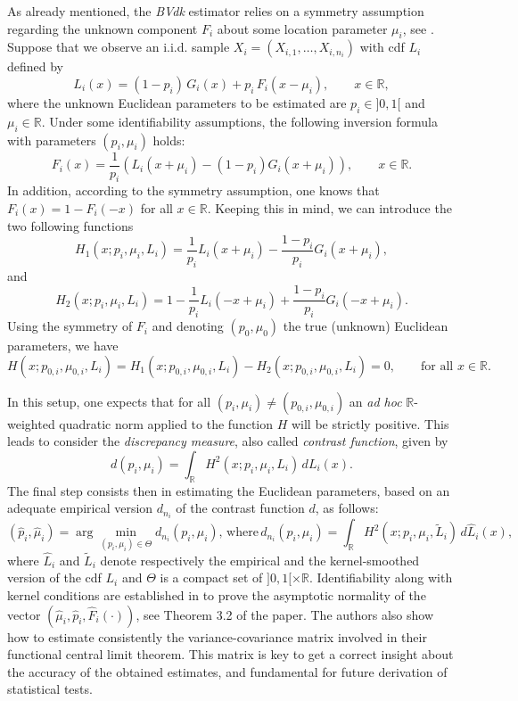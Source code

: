 As already mentioned, the \emph{BVdk} estimator relies on a symmetry assumption regarding the unknown component \(F_i\) about some location parameter \(\mu_i\), see \citeauthor{Bordes+Vandekerkhove:2010} \citetext{\citeyear{Bordes+Vandekerkhove:2010}; \citealp[and previous works by][]{Bordes+Delmas+Vandekerkhove:2006}}. Suppose that we observe an i.i.d. sample \(X_i=(X_{i,1}, \dots, X_{i,n_i})\) with cdf \(L_i\) defined by
\begin{equation}
  L_i(x) = (1-p_i) \, G_i(x) + p_i \, F_i(x - \mu_i), \qquad x \in \mathbb{R},
\label{eq:symmetricUnknownComp}
\end{equation}
where the unknown Euclidean parameters to be estimated are \(p_i\in ]0,1[\) and \(\mu_i\in \mathbb{R}\). Under some identifiability assumptions, the following inversion formula with parameters \((p_i,\mu_i)\) holds:
\[
F_i(x) = \frac{1}{p_i} \left( L_i(x+\mu_i) - (1-p_i) G_i(x+\mu_i) \right), \qquad x \in \mathbb{R}.
\]
In addition, according to the symmetry assumption, one knows that \(F_i(x) = 1 - F_i(-x)\) for all \(x \in \mathbb{R}\). Keeping this in mind, we can introduce the two following functions
\[
H_1(x; p_i,\mu_i, L_i) = \frac{1}{p_i} L_i(x+\mu_i) - \frac{1-p_i}{p_i} G_i(x+\mu_i),
\]
and
\[
H_2(x; p_i,\mu_i, L_i) = 1 - \frac{1}{p_i} L_i(-x+\mu_i) + \frac{1-p_i}{p_i} G_i(-x+\mu_i).
\]
Using the symmetry of \(F_i\) and denoting \((p_0, \mu_0)\) the true (unknown) Euclidean parameters, we have
\[
H(x; p_{0,i}, \mu_{0,i}, L_i) = H_1(x; p_{0,i},\mu_{0,i}, L_i) - H_2(x; p_{0,i},\mu_{0,i}, L_i) = 0, \qquad \mbox{for all } x \in \mathbb{R}.
\]

In this setup, one expects that for all \((p_i,\mu_i) \neq (p_{0,i},\mu_{0,i})\) an \emph{ad hoc} \(\mathbb{R}\)-weighted quadratic norm applied to the function \(H\) will be strictly positive. This leads to consider the \emph{discrepancy measure}, also called \emph{contrast function}, given by
\[
d(p_i,\mu_i) = \int_{\mathbb{R}} H^2(x; p_i,\mu_i, L_i) \, dL_i(x).
\]
The final step consists then in estimating the Euclidean parameters, based on an adequate empirical version \(d_{n_i}\) of the contrast function \(d\), as follows:
\begin{equation}
  (\hat{p}_{i},\hat{\mu}_{i}) = \arg\min_{(p_i,\mu_i)\in \Theta} d_{n_i}(p_i,\mu_i),
  \, \text{where} \,
  d_{n_i}(p_i,\mu_i) = \int_{\mathbb{R}} H^2(x; p_i,\mu_i, \tilde L_i) \, d\hat L_i(x),
\label{eq:contrastEmpBVdk}
\end{equation}
where \(\hat L_i\) and \(\tilde L_i\) denote respectively the empirical and the kernel-smoothed version of the cdf \(L_i\) and \(\Theta\) is a compact set of \(]0,1[\times \mathbb R\). Identifiability along with kernel conditions are established in \citet{Bordes+Vandekerkhove:2010} to prove the asymptotic normality of the vector \((\hat{\mu}_{i},\hat{p}_{i},\hat{F}_{i}(\cdot))\), see Theorem 3.2 of the paper. The authors also show how to estimate consistently the variance-covariance matrix involved in their functional central limit theorem. This matrix is key to get a correct insight about the accuracy of the obtained estimates, and fundamental for future derivation of statistical tests.

